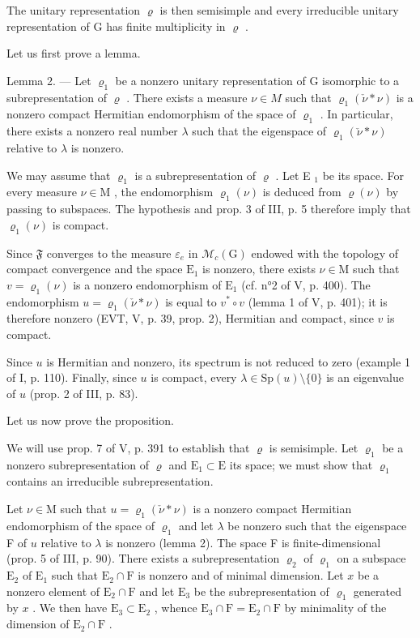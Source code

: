 The unitary representation \(\varrho\) is then semisimple and every irreducible unitary representation of G has finite multiplicity in \(\varrho\) .

Let us first prove a lemma.

Lemma 2. --- Let \(\varrho_{1}\) be a nonzero unitary representation of G isomorphic to a subrepresentation of \(\varrho\) . There exists a measure \(\nu \in M\) such that \(\varrho_{1}(\check{\nu} * \nu)\) is a nonzero compact Hermitian endomorphism of the space of \(\varrho_{1}\) . In particular, there exists a nonzero real number \(\lambda\) such that the eigenspace of \(\varrho_{1}(\check{\nu} * \nu)\) relative to \(\lambda\) is nonzero.

We may assume that \(\varrho_{1}\) is a subrepresentation of \(\varrho\) . Let E \(_{1}\) be its space. For every measure \(\nu \in \mathrm{M}\) , the endomorphism \(\varrho_{1}(\nu)\) is deduced from \(\varrho(\nu)\) by passing to subspaces. The hypothesis and prop. 3 of III, p. 5 therefore imply that \(\varrho_{1}(\nu)\) is compact.

Since \(\mathfrak{F}\) converges to the measure \(\varepsilon_{e}\) in \(\mathcal{M}_{c}(\mathrm{G})\) endowed with the topology of compact convergence and the space \(\mathrm{E}_{1}\) is nonzero, there exists \(\nu\in\mathrm{M}\) such that \(v=\varrho_{1}(\nu)\) is a nonzero endomorphism of \(\mathrm{E}_{1}\) (cf. n°2 of V, p. 400). The endomorphism \(u=\varrho_{1}(\check{\nu}*\nu)\) is equal to \(v^{*}\circ v\) (lemma 1 of V, p. 401); it is therefore nonzero (EVT, V, p. 39, prop. 2), Hermitian and compact, since \(v\) is compact.

Since \(u\) is Hermitian and nonzero, its spectrum is not reduced to zero (example 1 of I, p. 110). Finally, since \(u\) is compact, every \(\lambda \in \mathrm{Sp}(u)\setminus\{0\}\) is an eigenvalue of \(u\) (prop. 2 of III, p. 83).

Let us now prove the proposition.

We will use prop. 7 of V, p. 391 to establish that \(\varrho\) is semisimple. Let \(\varrho_{1}\) be a nonzero subrepresentation of \(\varrho\) and \(\mathrm{E}_{1} \subset \mathrm{E}\) its space; we must show that \(\varrho_{1}\) contains an irreducible subrepresentation.

Let \(\nu \in \mathrm{M}\) such that \(u = \varrho_{1}(\check{\nu}*\nu)\) is a nonzero compact Hermitian endomorphism of the space of \(\varrho_{1}\) and let \(\lambda\) be nonzero such that the eigenspace F of \(u\) relative to \(\lambda\) is nonzero (lemma 2). The space F is finite-dimensional (prop. 5 of III, p. 90). There exists a subrepresentation \(\varrho_{2}\) of \(\varrho_{1}\) on a subspace \(\mathrm{E}_{2}\) of \(\mathrm{E}_{1}\) such that \(\mathrm{E}_{2} \cap \mathrm{F}\) is nonzero and of minimal dimension. Let \(x\) be a nonzero element of \(\mathrm{E}_{2} \cap \mathrm{F}\) and let \(\mathrm{E}_{3}\) be the subrepresentation of \(\varrho_{1}\) generated by \(x\) . We then have \(\mathrm{E}_{3} \subset \mathrm{E}_{2}\) , whence \(\mathrm{E}_{3} \cap \mathrm{F} = \mathrm{E}_{2} \cap \mathrm{F}\) by minimality of the dimension of \(\mathrm{E}_{2} \cap \mathrm{F}\) .

